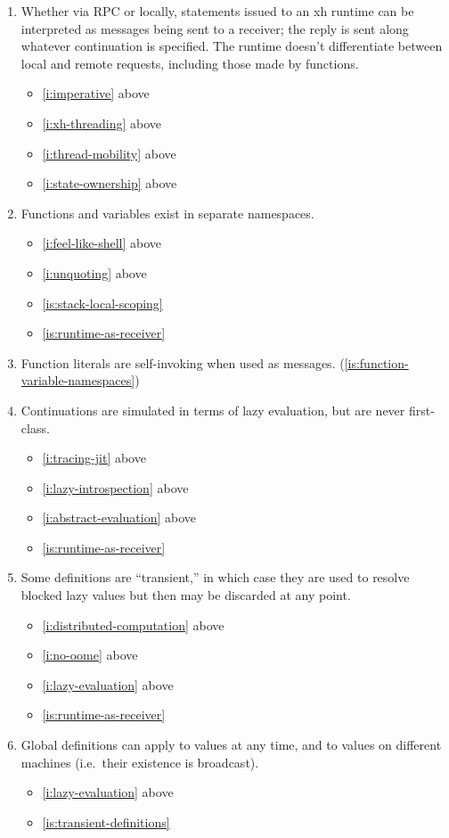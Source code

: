 \documentclass{report}
\makeatletter
\newcommand*{\Label}[2]{%
  \@bsphack
  \begingroup
    \label{#1-original}%
    \def\@currentlabel{#2 [\ref{#1-original}]}%
    \label{#1}%
  \endgroup
  \@esphack
}
\makeatother
\begin{document}
\begin{enumerate}
\item{}\Label{is:runtime-as-receiver}{runtimereceiver}
  Whether via RPC or locally, statements issued to an xh runtime can be
  interpreted as messages being sent to a receiver; the reply is sent along
  whatever continuation is specified. The runtime doesn't differentiate
  between local and remote requests, including those made by functions.
\begin{itemize}
\item \ref{i:imperative} above
\item \ref{i:xh-threading} above
\item \ref{i:thread-mobility} above
\item \ref{i:state-ownership} above
\end{itemize}
\item{}\Label{is:function-variable-namespaces}{namespaces}
  Functions and variables exist in separate namespaces.
\begin{itemize}
\item \ref{i:feel-like-shell} above
\item \ref{i:unquoting} above
\item \ref{is:stack-local-scoping}
\item \ref{is:runtime-as-receiver}
\end{itemize}
\item{}\Label{is:function-literals-as-messages}{fnliterals}
  Function literals are self-invoking when used as messages.
(\ref{is:function-variable-namespaces})
\item{}\Label{is:no-real-continuations}{nocallcc}
  Continuations are simulated in terms of lazy evaluation, but are never
  first-class.
\begin{itemize}
\item \ref{i:tracing-jit} above
\item \ref{i:lazy-introspection} above
\item \ref{i:abstract-evaluation} above
\item \ref{is:runtime-as-receiver}
\end{itemize}
\item{}\Label{is:transient-definitions}{transientdefs}
  Some definitions are ``transient,'' in which case they are used to
  resolve blocked lazy values but then may be discarded at any point.
\begin{itemize}
\item \ref{i:distributed-computation} above
\item \ref{i:no-oome} above
\item \ref{i:lazy-evaluation} above
\item \ref{is:runtime-as-receiver}
\end{itemize}
\item{}\Label{is:global-definition-universality}{globaldefs}
  Global definitions can apply to values at any time, and to values on
  different machines (i.e.~their existence is broadcast).
\begin{itemize}
\item \ref{i:lazy-evaluation} above
\item \ref{is:transient-definitions}
\end{itemize}


\end{enumerate}
\end{document}
